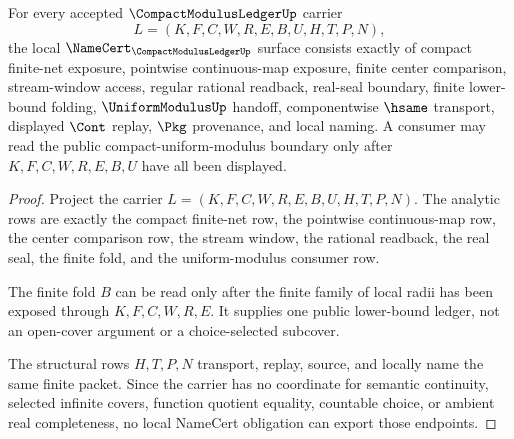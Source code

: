 \begin{theorem}
\label{thm:compact-modulus-ledger-namecert-obligations}
For every accepted $\CompactModulusLedgerUp$ carrier
$$
L=(K,F,C,W,R,E,B,U,H,T,P,N),
$$
the local $\NameCert_{\CompactModulusLedgerUp}$ surface consists exactly of compact finite-net exposure, pointwise continuous-map exposure, finite center comparison, stream-window access, regular rational readback, real-seal boundary, finite lower-bound folding, $\UniformModulusUp$ handoff, componentwise $\hsame$ transport, displayed $\Cont$ replay, $\Pkg$ provenance, and local naming. A consumer may read the public compact-uniform-modulus boundary only after $K,F,C,W,R,E,B,U$ have all been displayed.
\end{theorem}
\begin{proof}
Project the carrier $L=(K,F,C,W,R,E,B,U,H,T,P,N)$. The analytic rows are exactly the compact finite-net row, the pointwise continuous-map row, the center comparison row, the stream window, the rational readback, the real seal, the finite fold, and the uniform-modulus consumer row.

The finite fold $B$ can be read only after the finite family of local radii has been exposed through $K,F,C,W,R,E$. It supplies one public lower-bound ledger, not an open-cover argument or a choice-selected subcover.

The structural rows $H,T,P,N$ transport, replay, source, and locally name the same finite packet. Since the carrier has no coordinate for semantic continuity, selected infinite covers, function quotient equality, countable choice, or ambient real completeness, no local NameCert obligation can export those endpoints.
\end{proof}


